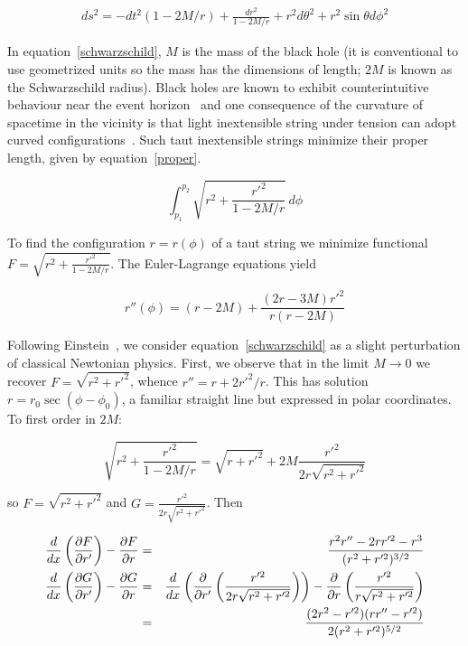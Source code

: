 \documentclass[pdflatex,sn-mathphys-num]{sn-jnl}%
\theoremstyle{thmstyleone}%
\theoremstyle{thmstyletwo}%
\theoremstyle{thmstylethree}%
\begin{document}
\begin{eqnarray}\label{schwarzschild}
  ds^2=
  -dt^2(1-2M/r) + \frac{dr^2}{1-2M/r} + r^2d\theta^2 + r^2\sin\theta d\phi^2
  \end{eqnarray}

In equation~\ref{schwarzschild}, $M$ is the mass of the black hole (it
is conventional to use geometrized units so the mass has the
dimensions of length; $2M$ is known as the Schwarzschild radius).
Black holes are known to exhibit counterintuitive behaviour near the
event horizon~\cite{allen1990} and one consequence of the curvature of
spacetime in the vicinity is that light inextensible string under
tension can adopt curved configurations~\cite{hankin2021}.  Such taut
inextensible strings minimize their proper length, given by
equation~\ref{proper}.

\begin{equation}\label{proper}
  \int_{p_1}^{p_2}\sqrt{r^2 + \frac{r'^2}{1-2M/r}}\,d\phi
\end{equation}

To find the configuration $r=r(\phi)$ of a taut string we minimize
functional $F=\sqrt{r^2 + \frac{r'^2}{1-2M/r}}$.  The Euler-Lagrange
equations yield

\begin{equation}\label{eulerstring}
  r''(\phi) = (r-2M) + \frac{(2r-3M)r'^2}{r(r-2M)}
\end{equation}


Following Einstein~\cite{einstein1915}, we consider
equation~\ref{schwarzschild} as a slight perturbation of classical
Newtonian physics.  First, we observe that in the limit
$M\longrightarrow 0$ we recover $F=\sqrt{r^2+r'^2}$, whence $r'' = r +
2r'^2/r$.  This has solution $r=r_0\sec(\phi-\phi_0)$, a familiar
straight line but expressed in polar coordinates.  To first order in
$2M$:

\begin{equation}
\sqrt{r^2 + \frac{r'^2}{1-2M/r}}=\sqrt{r+r'^2} + 2M\frac{r'^2}{2r\sqrt{r^2 + r'^2}}
\end{equation}
  
so $F=\sqrt{r^2+r'^2}$ and $G=\frac{r'^2}{2r\sqrt{r^2+r'^2}}$.  Then

\begin{eqnarray}\label{newtonian_string}
\frac{d}{dx}\left(\frac{\partial{F}}{\partial{r'}}\right) -\frac{\partial{F}}{\partial{r}} &=& \frac{r^2r''- 2rr'^2 -r^3}{(r^2 +r'^2)^{3/2}}\nonumber\\
\frac{d}{dx}\left(\frac{\partial{G}}{\partial{r'}}\right) -\frac{\partial{G}}{\partial{r}} &=&
\frac{d}{dx}\left(\frac{\partial}{\partial r'}\left(\frac{r'^2}{2r\sqrt{r^2+r'^2}}\right)\right)
- \frac{\partial}{\partial
  r}\left(\frac{r'^2}{r\sqrt{r^2+r'^2}}\right)\nonumber\\
&=& \frac{(2r^2-r'^2)(rr''-r'^2)}{2(r^2+r'^2)^{5/2}}
\end{eqnarray}
\end{document}
